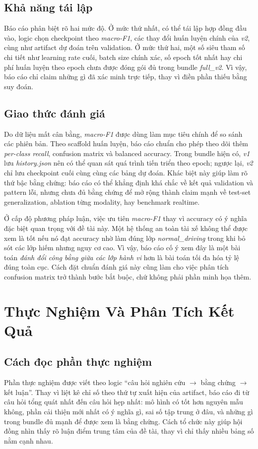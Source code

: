 \documentclass[conference,a4paper]{IEEEtran}
\begin{document}
\subsection{Khả năng tái lập}
Báo cáo phân biệt rõ hai mức độ. Ở mức thứ nhất, có thể tái lập hợp đồng đầu vào, logic chọn checkpoint theo \textit{macro-F1}, các thay đổi huấn luyện chính của \textit{v2}, cùng như artifact dự đoán trên validation. Ở mức thứ hai, một số siêu tham số chi tiết như learning rate cuối, batch size chính xác, số epoch tốt nhất hay chi phí huấn luyện theo epoch chưa được đóng gói đủ trong bundle \textit{full\_v2}. Vì vậy, báo cáo chỉ claim những gì đã xác minh trực tiếp, thay vì điền phần thiếu bằng suy đoán.

\subsection{Giao thức đánh giá}
Do dữ liệu mất cân bằng, \textit{macro-F1} được dùng làm mục tiêu chính để so sánh các phiên bản. Theo scaffold huấn luyện, báo cáo chuẩn cho phép theo dõi thêm \textit{per-class recall}, confusion matrix và balanced accuracy. Trong bundle hiện có, \textit{v1} lưu \textit{history.json} nên có thể quan sát quá trình tiến triển theo epoch; ngược lại, \textit{v2} chỉ lưu checkpoint cuối cùng cùng các bảng dự đoán. Khác biệt này giúp làm rõ thứ bậc bằng chứng: báo cáo có thể khẳng định khá chắc về kết quả validation và pattern lỗi, nhưng chưa đủ bằng chứng để mở rộng thành claim mạnh về test-set generalization, ablation từng modality, hay benchmark realtime.

Ở cấp độ phương pháp luận, việc ưu tiên \textit{macro-F1} thay vì accuracy có ý nghĩa đặc biệt quan trọng với đề tài này. Một hệ thống an toàn tài xế không thể được xem là tốt nếu nó đạt accuracy nhờ làm đúng lớp \textit{normal\_driving} trong khi bỏ sót các lớp hiếm nhưng nguy cơ cao. Vì vậy, báo cáo cố ý xem đây là một bài toán \textit{đánh đổi công bằng giữa các lớp hành vi} hơn là bài toán tối đa hóa tỷ lệ đúng toàn cục. Cách đặt chuẩn đánh giá này cũng làm cho việc phân tích confusion matrix trở thành bước bắt buộc, chứ không phải phần minh họa thêm.

\section[Thuc Nghiem Va Phan Tich Ket Qua]{Thực Nghiệm Và Phân Tích Kết Quả}
\subsection{Cách đọc phần thực nghiệm}
Phần thực nghiệm được viết theo logic ``câu hỏi nghiên cứu $\rightarrow$ bằng chứng $\rightarrow$ kết luận''. Thay vì liệt kê chỉ số theo thứ tự xuất hiện của artifact, báo cáo đi từ câu hỏi tổng quát nhất đến câu hỏi hẹp nhất: mô hình có tốt hơn nguyên mẫu không, phần cải thiện mới nhất có ý nghĩa gì, sai số tập trung ở đâu, và những gì trong bundle đủ mạnh để được xem là bằng chứng. Cách tổ chức này giúp hội đồng nhìn thấy rõ luận điểm trung tâm của đề tài, thay vì chỉ thấy nhiều bảng số nằm cạnh nhau.
\end{document}
